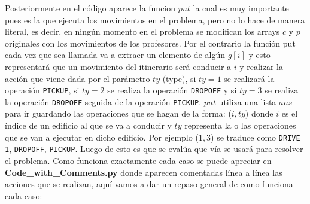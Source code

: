 \documentclass[11pt]{article}
\begin{document}
    Posteriormente en el código aparece la funcion $put$ la cual es muy importante pues es la que ejecuta los
    movimientos en el problema, pero no lo hace de manera literal, es decir, en ningún momento en el problema
    se modifican los arrays $c$ y $p$ originales con los movimientos de los profesores. Por el contrario la función
    put cada vez que sea llamada va a extraer un elemento de algún $g[i]$ y esto representará que un movimiento
    del itinerario será conducir a $i$ y realizar la acción que viene dada por el parámetro $ty$ (type), si $ty = 1$
    se realizará la operación \texttt{PICKUP}, si $ty = 2$ se realiza la operación \texttt{DROPOFF} y si $ty = 3$ se
    realiza la operación \texttt{DROPOFF} seguida de la operación \texttt{PICKUP}. $put$ utiliza una lista $ans$
    para ir guardando las operaciones que se hagan de la forma: ($i, ty$) donde $i$ es el índice de un edificio al
    que se va a conducir y $ty$ representa la o las operaciones que se van a ejecutar en dicho edificio. Por ejemplo
    ($1,3$) se traduce como \texttt{DRIVE 1}, \texttt{DROPOFF}, \texttt{PICKUP}. Luego de esto es que se evalúa que 
    vía se usará para resolver el problema. Como funciona exactamente cada caso se puede apreciar en 
    \textbf{Code\_with\_Comments.py} donde aparecen comentadas línea a línea las acciones que se realizan, aquí vamos 
    a dar un repaso general de como funciona cada caso:
\end{document}

